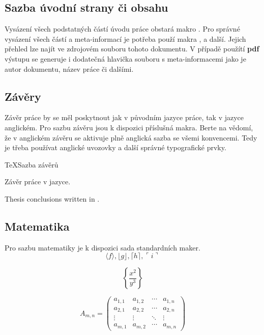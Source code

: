 \documentclass[
  field=inf,
  biblatex,
  glossaries,
  index
]{kidiplom}
\begin{document}
\subsection{Sazba úvodní strany či obsahu}
Vysázení všech podstatných částí úvodu práce obstará makro . Pro správné vysázení všech částí a meta-informací je potřeba použí makra ,  a další. Jejich přehled lze najít ve zdrojovém souboru tohoto dokumentu. V případě použítí \textbf{pdf} výstupu se generuje i dodatečná hlavička souboru s meta-informacemi jako je autor dokumentu, název práce či dalšími.

\subsection{Závěry}
Závěr práce by se měl poskytnout jak v původním jazyce práce, tak v jazyce anglickém. Pro sazbu závěru jsou k dispozici příslušná makra. Berte na vědomí, že v anglickém závěru se aktivuje plně anglická sazba se všemi konvencemi. Tedy je třeba používat anglické uvozovky a další správné typografické prvky.

\begin{kicode}{TeX}{}{Sazba závěrů}
\begin{kiconclusions}
Závěr práce v  jazyce.
\end{kiconclusions}

\begin{kiconclusions}[english]
Thesis conclusions written in .
\end{kiconclusions}
\end{kicode}

\subsection{Matematika}
Pro sazbu matematiky je k dispozici sada standardních maker.
$$\langle f \rangle, \lfloor g \rfloor,
\lceil h \rceil, \ulcorner i \urcorner$$

$$\left\{\frac{x^2}{y^3}\right\}$$

$$
A_{m,n} =
 \begin{pmatrix}
  a_{1,1} & a_{1,2} & \cdots & a_{1,n} \\
  a_{2,1} & a_{2,2} & \cdots & a_{2,n} \\
  \vdots  & \vdots  & \ddots & \vdots  \\
  a_{m,1} & a_{m,2} & \cdots & a_{m,n}
 \end{pmatrix}
$$
\end{document}
